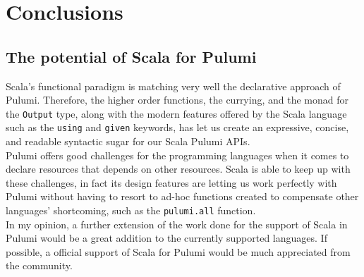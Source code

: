 
\chapter{Conclusions}
\label{cap:conclusions}


\section{The potential of Scala for Pulumi}
Scala's functional paradigm is matching very well the declarative approach of Pulumi.
Therefore, the higher order functions, the currying, and the monad for the \texttt{Output} type, along with the modern features offered by the Scala language such as the \texttt{using} and \texttt{given} keywords, has let us create an expressive, concise, and readable syntactic sugar for our Scala Pulumi APIs.\\
Pulumi offers good challenges for the programming languages when it comes to declare resources that depends on other resources.
Scala is able to keep up with these challenges, in fact its design features are letting us work perfectly with Pulumi without having to resort to ad-hoc functions created to compensate other languages' shortcoming, such as the \texttt{pulumi.all} function.\\
In my opinion, a further extension of the work done for the support of Scala in Pulumi would be a great addition to the currently supported languages.
If possible, a official support of Scala for Pulumi would be much appreciated from the community.
